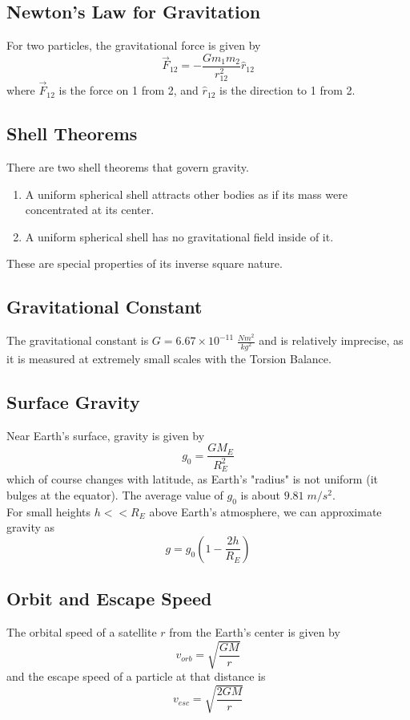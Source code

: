\documentclass[../PhysicsFormulae.tex]{subfiles}
\begin{document}
\subsection{Newton's Law for Gravitation}
For two particles, the gravitational force is given by
\[ \vec{F}_{12} = -\frac{Gm_1m_2}{r_{12}^2} \hat{r}_{12} \]
where $\vec{F}_{12}$ is the force on 1 from 2, and $\hat{r}_{12}$ is the direction to 1 from 2.

\subsection{Shell Theorems}
There are two shell theorems that govern gravity. 
\begin{enumerate}
\item A uniform spherical shell attracts other bodies as if its mass were concentrated at its center. 
\item A uniform spherical shell has no gravitational field inside of it. 
\end{enumerate}
These are special properties of its inverse square nature.

\subsection{Gravitational Constant}
The gravitational constant is $G = 6.67 \times 10^{-11} \; \frac{Nm^2}{kg^2}$ and is relatively imprecise, as it is measured at extremely small scales with the Torsion Balance. 

\subsection{Surface Gravity}
Near Earth's surface, gravity is given by
\[ g_0 = \frac{GM_E}{R_E^2} \] 
which of course changes with latitude, as Earth's "radius" is not uniform (it bulges at the equator). The average value of $g_0$ is about $9.81 \; m/s^2$.\\
For small heights $h<<R_E$ above Earth's atmosphere, we can approximate gravity as 
\[ g = g_0 \left( 1-\frac{2h}{R_E} \right) \]

\subsection{Orbit and Escape Speed}
The orbital speed of a satellite $r$ from the Earth's center is given by
\[ v_{orb} = \sqrt{\frac{GM}{r}} \]
and the escape speed of a particle at that distance is 
\[ v_{esc} = \sqrt{\frac{2GM}{r}} \]
\end{document}

